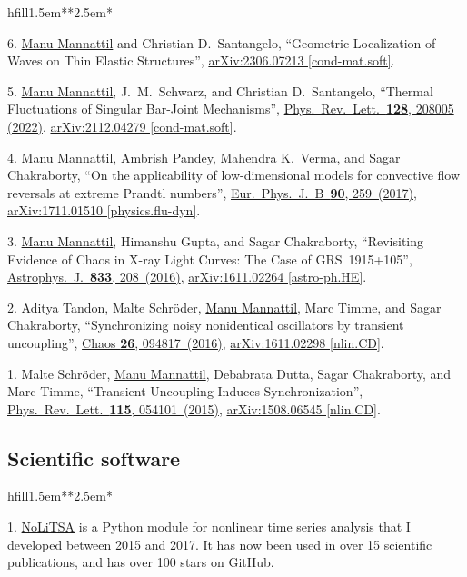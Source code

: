 \documentclass[10pt,a4paper,article,oneside]{memoir}
\def\bname{\underline{Manu Mannattil}}    %
\def\doi#1#2{\href{https://doi.org/#1}{#2}}
\def\arxiv#1#2{\href{https://arxiv.org/abs/#1}{arXiv:#1 [#2]}}
\begin{document}
\begin{flexlabelled}{hfill}{1.5em}{*}{*}{2.5em}{*}
  \setlength{\itemsep}{0pt}
  \item[6.] {\bname} and Christian D.~Santangelo, ``Geometric Localization of Waves on Thin Elastic Structures'', \arxiv{2306.07213}{cond-mat.soft}.
  \item[5.] \bname, J.~M.~Schwarz, and Christian D.~Santangelo, ``Thermal Fluctuations of Singular Bar-Joint Mechanisms'', \doi{10.1103/PhysRevLett.128.208005}{Phys.~Rev.~Lett.~\textbf{128}, 208005 (2022)}, \arxiv{2112.04279}{cond-mat.soft}.
  \item[4.] \bname, Ambrish Pandey, Mahendra K.~Verma, and Sagar Chakraborty, ``On the applicability of low-dimensional models for convective flow reversals at extreme Prandtl numbers'', \doi{10.1140/epjb/e2017-80391-1}{Eur.~Phys.~J.~B~\textbf{90}, 259~(2017)}, \arxiv{1711.01510}{physics.flu-dyn}.
  \item[3.] \bname, Himanshu Gupta, and Sagar Chakraborty, ``Revisiting Evidence of Chaos in X-ray Light Curves: The Case of GRS~1915+105'', \doi{10.3847/1538-4357/833/2/208}{Astrophys.~J.~\textbf{833}, 208~(2016)}, \arxiv{1611.02264}{astro-ph.HE}.
  \item[2.] Aditya Tandon, Malte Schr\"{o}der, \bname, Marc Timme, and Sagar Chakraborty, ``Synchronizing noisy nonidentical oscillators by transient uncoupling'', \doi{10.1063/1.4959141}{Chaos \textbf{26}, 094817~(2016)}, \arxiv{1611.02298}{nlin.CD}.
  \item[1.] Malte Schr\"{o}der, \bname, Debabrata Dutta, Sagar Chakraborty, and Marc Timme, ``Transient Uncoupling Induces Synchronization'', \doi{10.1103/PhysRevLett.115.054101}{Phys.~Rev.~Lett.~\textbf{115}, 054101~(2015)}, \arxiv{1508.06545}{nlin.CD}.
\end{flexlabelled}

\subsection{Scientific software}

\begin{flexlabelled}{hfill}{1.5em}{*}{*}{2.5em}{*}
  \setlength{\itemsep}{0pt}
  \item[1.] \href{https://github.com/manu-mannattil/NoLiTSA}{NoLiTSA} is a Python module for nonlinear time series analysis that I developed between 2015 and 2017.  It has now been used in over 15 scientific publications, and has over 100 stars on GitHub.
\end{flexlabelled}
\end{document}
